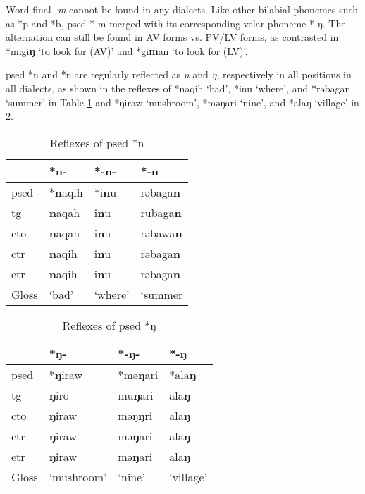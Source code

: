 Word-final -\textit{m} cannot be found in any dialects. Like other bilabial phonemes such as *p and *b, \acl{psed} *-m merged with its corresponding velar phoneme *-ŋ. The alternation can still be found in AV forms vs. PV/LV forms, as contrasted in *migi\textbf{ŋ} `to look for (AV)' and *gi\textbf{m}an `to look for (LV)'. 

\acl{psed} *n and *ŋ are regularly reflected as \textit{n} and \textit{ŋ}, respectively in all positions in all dialects, as shown in the reflexes of *naqih `bad', *inu `where', and *rəbagan `summer' in Table \ref{tab:psed_n} and *ŋiraw `mushroom', *məŋari `nine', and *alaŋ `village' in \ref{tab:psed_ŋ}.

\begin{table}[!htbp]
\centering
\caption{Reflexes of \acl{psed} *n}
\label{tab:psed_n}
\begin{tabular}{llll}
\hline
           & *n-    & *-n-    & *-n     \\ \hline
\acs{psed} & *\textbf{n}aqih & *i\textbf{n}u    & rəbaga\textbf{n} \\ \hdashline
\acs{tg}   & \textbf{n}aqah  & i\textbf{n}u     & rubaga\textbf{n} \\
\acs{cto}  & \textbf{n}aqah  & i\textbf{n}u     & rəbawa\textbf{n} \\
\acs{ctr}  & \textbf{n}aqih  & i\textbf{n}u     & rəbaga\textbf{n} \\
\acs{etr}  & \textbf{n}aqih  & i\textbf{n}u     & rəbaga\textbf{n} \\ \hline
Gloss      & `bad'  & `where' & `summer \\ \hline
\end{tabular}
\end{table}

\begin{table}[!htbp]
\centering
\caption{Reflexes of \acl{psed} *ŋ}
\label{tab:psed_ŋ}
\begin{tabular}{llll}
\hline
           & *ŋ-        & *-ŋ-    & *-ŋ       \\ \hline
\acs{psed} & *\textbf{ŋ}iraw     & *mə\textbf{ŋ}ari & *ala\textbf{ŋ}     \\ \hdashline
\acs{tg}   & \textbf{ŋ}iro       & mu\textbf{ŋ}ari  & ala\textbf{ŋ}      \\
\acs{cto}  & \textbf{ŋ}iraw      & məŋ\textbf{ŋ}ri  & ala\textbf{ŋ}      \\
\acs{ctr}  & \textbf{ŋ}iraw      & mə\textbf{ŋ}ari  & ala\textbf{ŋ}      \\
\acs{etr}  & \textbf{ŋ}iraw      & mə\textbf{ŋ}ari  & ala\textbf{ŋ}      \\ \hline
Gloss      & `mushroom' & `nine'  & `village' \\ \hline
\end{tabular}
\end{table}

